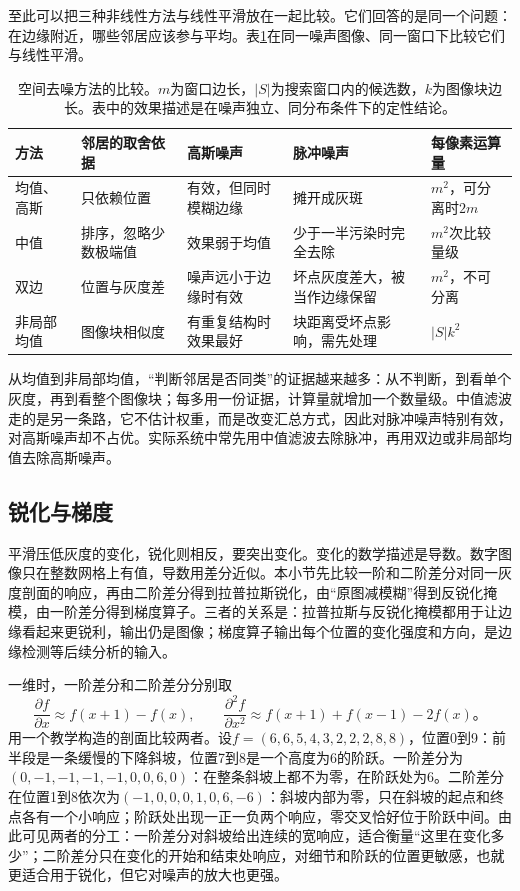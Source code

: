 至此可以把三种非线性方法与线性平滑放在一起比较。它们回答的是同一个问题：在边缘附近，哪些邻居应该参与平均。表\ref{tab:vision-transforms-denoise-compare}在同一噪声图像、同一窗口下比较它们与线性平滑。

\begin{table}[tbp]
  \centering
  \small
  \begin{tabularx}{\linewidth}{@{}p{16mm}XXXX@{}}
    \toprule
    方法 & 邻居的取舍依据 & 高斯噪声 & 脉冲噪声 & 每像素运算量\\
    \midrule
    均值、高斯 & 只依赖位置 & 有效，但同时模糊边缘 & 摊开成灰斑 & $m^2$，可分离时$2m$\\
    中值 & 排序，忽略少数极端值 & 效果弱于均值 & 少于一半污染时完全去除 & $m^2$次比较量级\\
    双边 & 位置与灰度差 & 噪声远小于边缘时有效 & 坏点灰度差大，被当作边缘保留 & $m^2$，不可分离\\
    非局部均值 & 图像块相似度 & 有重复结构时效果最好 & 块距离受坏点影响，需先处理 & $|S|k^2$\\
    \bottomrule
  \end{tabularx}
  \caption{空间去噪方法的比较。$m$为窗口边长，$|S|$为搜索窗口内的候选数，$k$为图像块边长。表中的效果描述是在噪声独立、同分布条件下的定性结论。}
  \label{tab:vision-transforms-denoise-compare}
\end{table}

从均值到非局部均值，“判断邻居是否同类”的证据越来越多：从不判断，到看单个灰度，再到看整个图像块；每多用一份证据，计算量就增加一个数量级。中值滤波走的是另一条路，它不估计权重，而是改变汇总方式，因此对脉冲噪声特别有效，对高斯噪声却不占优。实际系统中常先用中值滤波去除脉冲，再用双边或非局部均值去除高斯噪声。

\subsection{锐化与梯度}
\label{sec:vision-transforms-sharpening}

平滑压低灰度的变化，锐化则相反，要突出变化。变化的数学描述是导数。数字图像只在整数网格上有值，导数用差分近似。本小节先比较一阶和二阶差分对同一灰度剖面的响应，再由二阶差分得到拉普拉斯锐化，由“原图减模糊”得到反锐化掩模，由一阶差分得到梯度算子。三者的关系是：拉普拉斯与反锐化掩模都用于让边缘看起来更锐利，输出仍是图像；梯度算子输出每个位置的变化强度和方向，是边缘检测等后续分析的输入。

一维时，一阶差分和二阶差分分别取
\begin{equation}
  \frac{\partial f}{\partial x}\approx f(x+1)-f(x),\qquad
  \frac{\partial^2f}{\partial x^2}\approx f(x+1)+f(x-1)-2f(x)\text{。}
  \label{eq:vision-transforms-differences}
\end{equation}
用一个教学构造的剖面比较两者。设$f=(6,6,5,4,3,2,2,2,8,8)$，位置0到9：前半段是一条缓慢的下降斜坡，位置7到8是一个高度为6的阶跃。一阶差分为$(0,-1,-1,-1,-1,0,0,6,0)$：在整条斜坡上都不为零，在阶跃处为6。二阶差分在位置1到8依次为$(-1,0,0,0,1,0,6,-6)$：斜坡内部为零，只在斜坡的起点和终点各有一个小响应；阶跃处出现一正一负两个响应，零交叉恰好位于阶跃中间。由此可见两者的分工：一阶差分对斜坡给出连续的宽响应，适合衡量“这里在变化多少”；二阶差分只在变化的开始和结束处响应，对细节和阶跃的位置更敏感，也就更适合用于锐化，但它对噪声的放大也更强。

